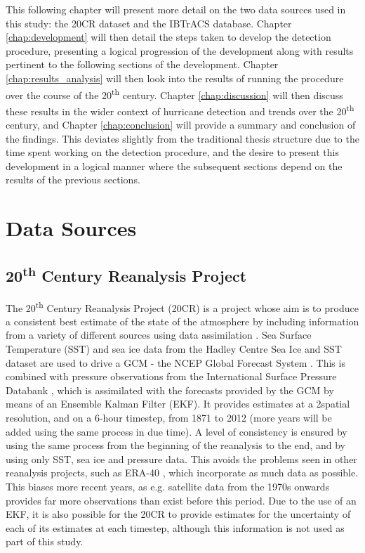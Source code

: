 \documentclass[pdftex,12pt,a4paper]{report}
\newcommand{\ts}{\textsuperscript}
\begin{document}
This following chapter will present more detail on the two data sources used in this study: the
20CR dataset and the IBTrACS database. Chapter \ref{chap:development} will then detail the steps
taken to develop the detection procedure, presenting a logical progression of the development along
with results pertinent to the following sections of the development. Chapter
\ref{chap:results_analysis} will then look into the results of running the procedure over the course
of the 20\ts{th} century. Chapter \ref{chap:discussion} will then discuss these results in the wider
context of hurricane detection and trends over the 20\ts{th} century, and Chapter
\ref{chap:conclusion} will provide a summary and conclusion of the findings. This deviates slightly
from the traditional thesis structure due to the time spent working on the detection procedure, and
the desire to present this development in a logical manner where the subsequent sections depend on
the results of the previous sections.

\chapter{Data Sources}

\section{20\ts{th} Century Reanalysis Project}
\label{sec:20crp}

The 20\ts{th} Century Reanalysis Project (20CR) is a project whose aim is to produce a consistent
best estimate of the state of the atmosphere by including information from a variety of different
sources using data assimilation \parencite{compoTwentieth2011}. Sea Surface Temperature (SST) and
sea ice data from the Hadley Centre Sea Ice and SST dataset \parencite{rayner2003} are used to drive
a GCM - the NCEP Global Forecast System \parencite{TODOCITE}. This is combined with pressure
observations from the International Surface Pressure Databank \parencite{TODOCITE}, which is
assimilated with the forecasts provided by the GCM by means of an Ensemble Kalman Filter (EKF). It
provides estimates at a 2\textdegree spatial resolution, and on a 6-hour timestep, from 1871 to 2012
(more years will be added using the same process in due time). A level of consistency is ensured by
using the same process from the beginning of the reanalysis to the end, and by using only SST, sea
ice and pressure data. This avoids the problems seen in other reanalysis projects, such as ERA-40
\parencite{TODOCITE}, which incorporate as much data as possible. This biases more recent years, as
e.g. satellite data from the 1970s onwards provides far more observations than exist before this
period. Due to the use of an EKF, it is also possible for the 20CR to provide estimates for the
uncertainty of each of its estimates at each timestep, although this information is not used as part
of this study.
\end{document}
